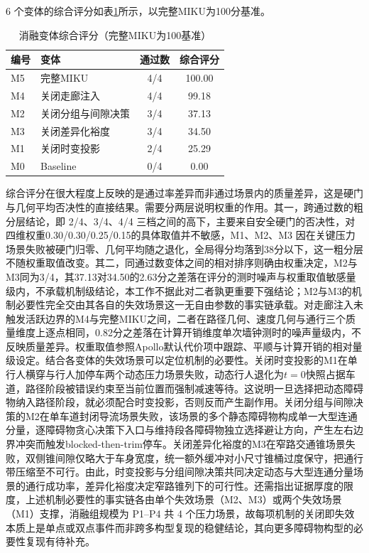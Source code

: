 \documentclass[a4paper,11pt]{ctexart}
\theoremstyle{definition}
\begin{document}
6 个变体的综合评分如表\ref{tab:exp_ablation_score}所示，以完整MIKU为100分基准。

\begin{table}[htbp]
\centering
\caption{消融变体综合评分（完整MIKU为100基准）}
\label{tab:exp_ablation_score}
\small
\begin{tabular}{llcc}
\toprule
\textbf{编号} & \textbf{变体} & \textbf{通过数} & \textbf{综合评分} \\
\midrule
M5 & 完整MIKU             & 4/4 & 100.00 \\
M4 & 关闭走廊注入         & 4/4 & 99.18 \\
M2 & 关闭分组与间隙决策   & 3/4 & 37.13 \\
M3 & 关闭差异化裕度       & 3/4 & 34.50 \\
M1 & 关闭时变投影         & 2/4 & 25.29 \\
M0 & Baseline             & 0/4 & 0.00 \\
\bottomrule
\end{tabular}
\end{table}

综合评分在很大程度上反映的是通过率差异而非通过场景内的质量差异，这是硬门与几何平均否决性的直接结果。需要分两层说明权重的作用。其一，跨通过数的粗分层结论，即 2/4、3/4、4/4 三档之间的高下，主要来自安全硬门的否决性，对四维权重0.30/0.30/0.25/0.15的具体取值并不敏感，M1、M2、M3 因在关键压力场景失败被硬门归零、几何平均随之退化，全局得分均落到38分以下，这一粗分层不随权重取值改变。其二，同通过数变体之间的相对排序则确由权重决定，M2与M3同为3/4，其37.13对34.50的2.63分之差落在评分的测时噪声与权重取值敏感量级内，不承载机制级结论，本工作不据此对二者孰更重要下强结论；M2与M3的机制必要性完全交由其各自的失效场景这一无自由参数的事实链承载。对走廊注入未触发活跃边界的M4与完整MIKU之间，二者在路径几何、速度几何与通行三个质量维度上逐点相同，0.82分之差落在计算开销维度单次墙钟测时的噪声量级内，不反映质量差异。权重取值参照Apollo默认代价项中跟踪、平顺与计算开销的相对量级设定。结合各变体的失效场景可以定位机制的必要性。关闭时变投影的M1在单行人横穿与行人加停车两个动态压力场景失败，动态行人退化为$t=0$快照占据车道，路径阶段被错误约束至当前位置而强制减速等待。这说明一旦选择把动态障碍物纳入路径阶段，就必须配合时变投影，否则反而产生副作用。关闭分组与间隙决策的M2在单车道封闭导流场景失败，该场景的多个静态障碍物构成单一大型连通分量，逐障碍物贪心决策下入口与维持段各障碍物独立选择避让方向，产生左右边界冲突而触发blocked-then-trim停车。关闭差异化裕度的M3在窄路交通锥场景失败，双侧锥间隙仅略大于车身宽度，统一额外缓冲对小尺寸锥桶过度保守，把通行带压缩至不可行。由此，时变投影与分组间隙决策共同决定动态与大型连通分量场景的通行成功率，差异化裕度决定窄路锥列下的可行性。还需指出证据厚度的限度，上述机制必要性的事实链各由单个失效场景（M2、M3）或两个失效场景（M1）支撑，消融组规模为 P1--P4 共 4 个压力场景，故每项机制的关闭即失效本质上是单点或双点事件而非跨多构型复现的稳健结论，其向更多障碍物构型的必要性复现有待补充。
\end{document}
